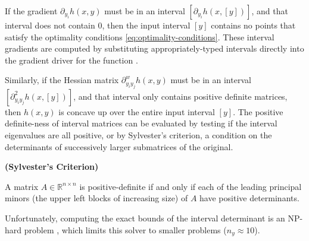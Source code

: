 \documentclass[twoside,leqno, twocolumn]{article}
\newcommand{\bbR}{\ensuremath{\mathbb{R}}}
\begin{document}
If the gradient $\partial_{y_i}h(x, y)$ must be in an interval $\left[\partial_{y_i}h(x, \left[y\right])\right]$, and that interval does not contain $0$, then the input interval $\left[y\right]$ contains no points that satisfy the optimality conditions \eqref{eq:optimality-conditions}. These interval gradients are computed by substituting appropriately-typed intervals directly into the gradient driver for the function \cite{griewankEvaluatingDerivativesPrinciples2008, rallGlobalOptimizationUsing1985}. 

Similarly, if the Hessian matrix $\partial^w_{y_iy_j}h(x,y)$ must be in an interval $\left[\partial^2_{y_iy_j}h(x, \left[y\right])\right]$, and that interval only contains positive definite matrices, then $h(x, y)$ is concave up over the entire input interval $\left[y\right]$. The positive definite-ness of interval matrices can be evaluated by testing if the interval eigenvalues are all positive, or by Sylvester's criterion, a condition on the determinants of successively larger submatrices of the original.

\begin{Definition}
	\label{def:sylvester}
	\textbf{(Sylvester's Criterion)}
	
	A matrix $A\in\bbR^{n\times n}$ is positive-definite if and only if each of the leading principal minors (the upper left blocks of increasing size) of $A$ have positive determinants.
\end{Definition}
Unfortunately, computing the exact bounds of the interval determinant is an NP-hard problem \cite{horacekDeterminantsIntervalMatrices2018}, which limits this solver to smaller problems ($n_y\approx10$). 
\end{document}
